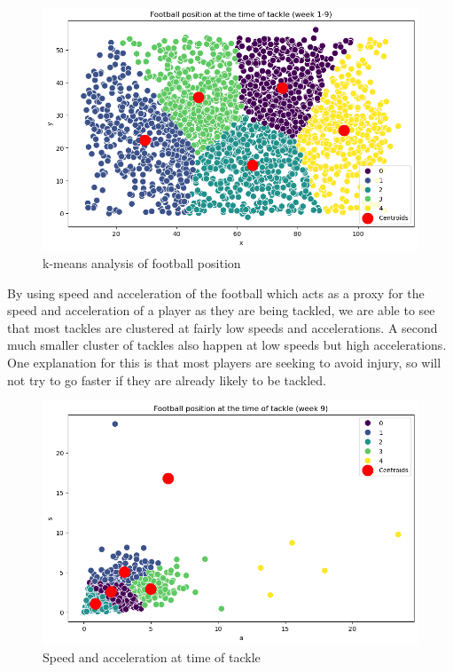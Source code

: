 \documentclass[bibtex, sigconf, hyperref={colorlinks=true,linkcolor=blue,urlcolor=blue}]{acmart}
\begin{document}
\begin{figure}[h]
  \centering
  \includegraphics[width=\linewidth]{k-means}
  \caption{k-means analysis of football position}
\end{figure}

By using speed and acceleration of the football which acts as a proxy for the
speed and acceleration of a player as they are being tackled, we are able to see
that most tackles are clustered at fairly low speeds and accelerations. A second
much smaller cluster of tackles also happen at low speeds but high accelerations.
One explanation for this is that most players are seeking to avoid injury, so
will not try to go faster if they are already likely to be tackled.

\begin{figure}[h]
  \centering
  \includegraphics[width=\linewidth]{speed-accel}
  \caption{Speed and acceleration at time of tackle}
\end{figure}
\end{document}
